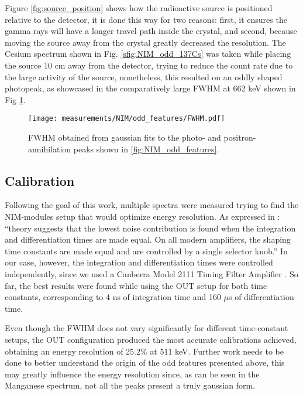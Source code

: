 Figure \ref{fig:source_position} shows how the radioactive source is positioned relative to the detector, it is done this way for two reasons: first, it ensures the gamma rays will have a longer travel path inside the crystal, and second, because moving the source away from the crystal greatly decreased the resolution. The Cesium spectrum shown in Fig. \ref{sfig:NIM_odd_137Cs} was taken while placing the source 10 cm away from the detector, trying to reduce the count rate due to the large activity of the source, nonetheless, this resulted on an oddly shaped photopeak, as showcased in the comparatively large FWHM at 662 keV shown in Fig \ref{fig:NIM_odd_FWHM}.  

\begin{figure}[H]
  \centering
  \texttt{[image: measurements/NIM/odd\_features/FWHM.pdf]}
  \caption{\label{fig:NIM_odd_FWHM}FWHM obtained from gaussian fits to the photo- and positron-annihilation peaks shown in \ref{fig:NIM_odd_features}.}
\end{figure}

\subsection{Calibration}

Following the goal of this work, multiple spectra were measured trying to find the NIM-modules setup that would optimize energy resolution. As expressed in \cite[sec.~4.4.3]{gilmore2008practical}: ``theory suggests that the lowest noise contribution is found when the integration and differentiation times are made equal. On all modern amplifiers, the shaping time constants are made equal and are controlled by a single selector knob.'' In our case, however, the integration and differentiation times were controlled independently, since we used a Canberra Model 2111 Timing Filter Amplifier \cite{CanberraTFA}. So far, the best results were found while using the OUT setup for both time constants, corresponding to 4 ns of integration time and 160 $\mu$s of differentiation time. 

Even though the FWHM does not vary significantly for different time-constant setups, the OUT configuration produced the most accurate calibrations achieved, obtaining an energy resolution of 25.2\% at 511 keV. Further work needs to be done to better understand the origin of the odd features presented above, this may greatly influence the energy resolution since, as can be seen in the Manganese spectrum, not all the peaks present a truly gaussian form.

